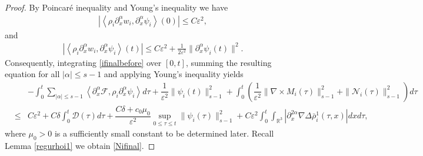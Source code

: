 \documentclass[reqno,twoside,12pt,a4paper]{amsart}
\newcommand{\eps}{\mathbb{\varepsilon}}
\newcommand{\al}{\alpha}
\newcommand{\pa}{\partial}
\newcommand{\D}{\nabla}
\newcommand{\calf}{\mathcal{F}}
\newcommand{\Ni}{\mathcal{N}_i}
\numberwithin{equation}{section}
\begin{document}
\begin{proof}
By Poincar\'e inequality and Young's inequality we have
\begin{eqnarray*}\label{inftyat0}
    |\left\langle \rho_i \partial^\al_x w_i, \partial^\al_x \psi_i \right\rangle(0)| 
    \leq  C\eps^2,
\end{eqnarray*}
and
\begin{eqnarray*}\label{inftyatt}
    |\left\langle \rho_i \partial^\al_x w_i, \partial^\al_x \psi_i \right\rangle(t)| \leq  C\eps^2 + \frac{1}{2\eps^2} \|\partial^\al_x \psi_i(t)\|^2.
\end{eqnarray*}
Consequently, integrating \eqref{ifinalbefore} over $[0,t]$, summing the resulting equation for all $|\al|\leq s-1$ and applying Young's inequality yields
\begin{eqnarray*}
&&-\int_0^t\sum_{|\al|\leq s-1}\left\langle \pa_x^\al \calf, \rho_i \partial^\al_x \psi_i\right\rangle d\tau+\dfrac{1}{\eps^2}\|\psi_i(t)\|_{s-1}^2+\int_0^t\left(\dfrac{1}{\eps^2}\|\D\times M_i(\tau)\|_{s-1}^2+\|\Ni(\tau)\|_{s-1}^2\right)d\tau\nonumber\\
&\leq& C\eps^2+C\delta\int_0^t\mathcal{D}(\tau)d\tau + \dfrac{C\delta+c_0\mu_0}{\eps^2}\sup_{0\leq \tau \leq t}\|\psi_i(\tau)\|_{s-1}^2 + C\eps^2 \int_0^t \int_{\mathbb{R}^3} |\pa_x^{2\al} \D \Delta \bar{\rho}^1_i (\tau,x)| dx d\tau,
\end{eqnarray*}
where $\mu_0>0$ is a sufficiently small constant to be determined later.
Recall Lemma \ref{regurhoi1} we obtain \eqref{Nifinal}.
\end{proof}
\end{document}
